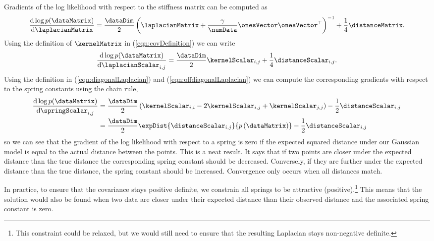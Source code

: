 Gradients of the log likelihood with respect to the stiffness matrix
can be computed as
\[
\frac{\mathrm{d}\log p(\dataMatrix)}{\mathrm{d}\laplacianMatrix} =
\frac{\dataDim}{2}\left(\laplacianMatrix +
  \frac{\gamma}{\numData}\onesVector\onesVector^\top\right)^{-1} +
\frac{1}{4} \distanceMatrix.
\]
Using the definition of $\kernelMatrix$ in (\ref{eqn:covDefinition})
we can write
\[
\frac{\mathrm{d}\log p(\dataMatrix)}{\mathrm{d}\laplacianScalar_{i,j}}
= \frac{\dataDim}{2}\kernelScalar_{i,j} + \frac{1}{4}
\distanceScalar_{i,j}.
\]
Using the definition in (\ref{eqn:diagonalLaplacian}) and
(\ref{eqn:offdiagonalLaplacian}) we can compute the corresponding
gradients with respect to the spring constants using the chain rule,
\begin{align*}
  \frac{\mathrm{d}\log p(\dataMatrix)}{\mathrm{d}\springScalar_{i,j}} &= \frac{\dataDim}{2}\left(\kernelScalar_{i,i} - 2\kernelScalar_{i,j} + \kernelScalar_{j,j}\right) - \frac{1}{2} \distanceScalar_{i,j}\\
 & =
  \frac{\dataDim}{2}\expDist{\distanceScalar_{i,j}}{p\left(\dataMatrix\right)}
  - \frac{1}{2} \distanceScalar_{i,j}
\end{align*}
so we can see that the gradient of the log likelihood with respect to
a spring is zero if the expected squared distance under our Gaussian
model is equal to the actual distance between the points. This is a neat result. It says that if two points are closer under the expected distance than the true distance the corresponding spring constant should be decreased. Conversely, if they are further under the expected distance than the true distance, the spring constant should be increased. Convergence only occurs when all distances match.

In practice, to ensure that the covariance stays positive definite, we
constrain all springs to be attractive (positive).\footnote{This constraint could
  be relaxed, but we would still need to ensure that the resulting
  Laplacian stays non-negative definite.} This means that the solution
would also be found when two data are closer under their expected
distance than their observed distance and the associated spring
constant is zero.

